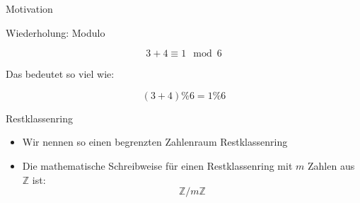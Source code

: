 \begin{frame}[fragile]{Motivation}
    \begin{center}
        \vspace{1cm}

    \end{center}
\end{frame}

\begin{frame}[fragile]{Wiederholung: Modulo}
    \begin{center}
        \Large
        $$
            3+4 \equiv 1 \mod 6
        $$

        \pause
        Das bedeutet so viel wie:

        $$
            (3+4)\% 6 = 1 \% 6
        $$
    \end{center}
\end{frame}


\begin{frame}[fragile]{Restklassenring}
    \begin{itemize}
        \item Wir nennen so einen begrenzten Zahlenraum \alert{Restklassenring}
        \item Die mathematische Schreibweise für einen Restklassenring mit $m$ Zahlen aus $\mathbb{Z}$ ist:
              $$
                  \mathbb Z / m\mathbb Z
              $$
    \end{itemize}
\end{frame}

